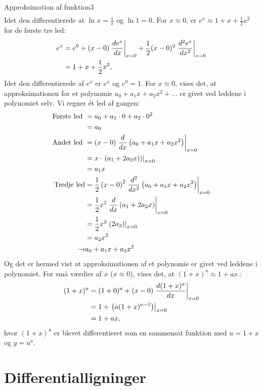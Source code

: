 \begin{opgave}{Approksimation af funktion}{3}
\begin{align*}
  \end{align*}
  Idet den differentierede at $\ln x = \frac{1}{x}$ og $\ln 1=0$.
  \opg For $x \approx 0$, er $e^x \approx 1 + x + \frac{1}{2}
  x^2$ for de første tre led:
  \begin{align*}
  e^x &= e^0 + (x-0) \left. {d{e^x} \over d{x}}\right|_{x=0} + \frac{1}{2}(x-0)^2 \left. {d^2{e^x} \over d{x}^2}\right|_{x=0} \\
  &=1 + x + \frac{1}{2} x^2,
  \end{align*}
  Idet den differentierede af $e^x$ er $e^x$ og $e^0 = 1$.
  \opg For $x \approx 0$, vises det, at approksimationen for et polynomie
  $a_0 + a_1 x + a_2 x^2 + \ldots$ er givet ved leddene i polynomiet
  selv. Vi regner ét led af gangen:
  \begin{align*}
  \text{Første led } &= a_0 + a_1\cdot 0 + a_2 \cdot 0^2 \\
  &= a_0 \\
  \text{Andet led } &= (x-0) \left. {d{} \over d{x}} \left(a_0 + a_1x + a_2x^2 \right)\right|_{x=0} \\
  &= x \cdot \left. \left(a_1 + 2a_2x) \right)\right|_{x=0} \\
  &= a_1 x \\
  \text{Tredje led} &= \frac{1}{2} \left( x-0 \right)^2 \left. {d^2{} \over d{x}^2} \left(a_0 + a_1x + a_2x^2 \right)\right|_{x=0} \\
  &= \frac{1}{2} x^2 \left. {d{} \over d{x}} \left(a_1 + 2a_2x \right)\right|_{x=0} \\
  &= \frac{1}{2} x^2 \left. \left( 2a_2 \right)\right|_{x=0} \\
  &= a_2 x^2 \\
  \rightarrow & a_0 + a_1x+a_2x^2
  \end{align*}
  Og det er hermed vist at approksimationen af et polynomie er givet ved leddene i polynomiet.
  \opg For små værdier af $x$ ($x \approx 0$), vises det, at $(1 + x)^a \approx 1 + ax$.:
  \begin{align*}
  (1+x)^a &= (1+0)^a + (x-0) \left. {d{(1+x)^a} \over d{x}}\right|_{x=0} \\
  &= 1 + \left. \left( a(1+x)^{a-1} \right)\right|_{x=0} \\
  &= 1 + ax,
  \end{align*}
  hvor $(1+x)^a$ er blevet differentieret som en sammensat funktion med $u=1+x$ og $g=u^a$.
\end{opgave}

\newpage

\section*{Differentialligninger}

